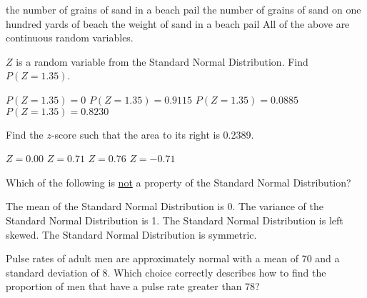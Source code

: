 \documentclass[noanswers]{exam}
\begin{document}
\begin{questions}
\begin{choices}
	\choice the number of grains of sand in a beach pail
	\choice the number of grains of sand on one hundred yards of beach
	\CorrectChoice the weight of sand in a beach pail
	\choice All of the above are continuous random variables.
\end{choices}

\vspace{3mm} 

\question $Z$ is a random variable from the Standard Normal Distribution. Find $P(Z=1.35)$.

\vspace{3mm}

\begin{choices}
	\CorrectChoice $P(Z=1.35)=0$
	\choice $P(Z=1.35)=0.9115$
	\choice $P(Z=1.35)=0.0885$
	\choice $P(Z=1.35)=0.8230$
\end{choices}

\vspace{3mm}

\question Find the $z$-score such that the area to its right is 0.2389.

\vspace{3mm}

\begin{choices}
	\choice $Z=0.00$
	\CorrectChoice $Z=0.71$
	\choice $Z=0.76$
	\choice $Z=-0.71$
\end{choices}

\vspace{3mm}

\question Which of the following is \underline{not} a property of the Standard Normal Distribution?

\vspace{3mm}

\begin{choices}
\choice The mean of the Standard Normal Distribution is 0.
\choice The variance of the Standard Normal Distribution is 1.
\CorrectChoice The Standard Normal Distribution is left skewed.
\choice The Standard Normal Distribution is symmetric.
\end{choices}

\vspace{3mm}

\question Pulse rates of adult men are approximately normal with a mean of 70 and a standard deviation of 8. Which choice correctly describes how to find the proportion of men that have a pulse rate greater than 78?

\vspace{3mm}


\end{questions}
\end{document}
